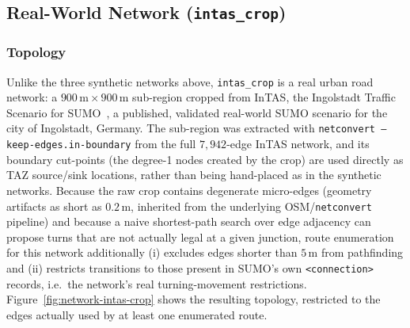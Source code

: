 \documentclass[11pt]{article}
\begin{document}
\newpage

\subsection{Real-World Network (\texttt{intas\_crop})}
\label{app:network_intas_crop}

\subsubsection*{Topology}

Unlike the three synthetic networks above, \texttt{intas\_crop} is a real
urban road network: a $900\,\mathrm{m}\times 900\,\mathrm{m}$ sub-region
cropped from InTAS, the Ingolstadt Traffic Scenario for
SUMO~\parencite{lobo2020intas}, a published, validated real-world SUMO
scenario for the city of Ingolstadt, Germany. The sub-region was extracted
with \texttt{netconvert --keep-edges.in-boundary} from the full
$7{,}942$-edge InTAS network, and its boundary cut-points (the degree-1
nodes created by the crop) are used directly as TAZ source/sink locations,
rather than being hand-placed as in the synthetic networks. Because the
raw crop contains degenerate micro-edges (geometry artifacts as short as
$0.2\,\mathrm{m}$, inherited from the underlying OSM/\texttt{netconvert}
pipeline) and because a naive shortest-path search over edge adjacency can
propose turns that are not actually legal at a given junction, route
enumeration for this network additionally (i) excludes edges shorter than
$5\,\mathrm{m}$ from pathfinding and (ii) restricts transitions to those
present in SUMO's own \texttt{<connection>} records, i.e.\ the network's
real turning-movement restrictions. Figure~\ref{fig:network-intas-crop}
shows the resulting topology, restricted to the edges actually used by at
least one enumerated route.
\end{document}
